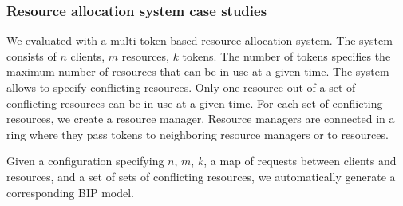 \begin{table}
\label{bench:dining}
\end{table}



\subsubsection{Resource allocation system case studies}

We evaluated \deadlocktool{} with a multi token-based resource allocation system. 
The system consists of $n$ clients, $m$ resources, $k$ tokens. 
The number of tokens specifies the maximum number of resources that
can be in use at a given time. 
The system allows to specify conflicting resources. 
Only one resource out of a set of conflicting resources can be in use at a given time.
For each set of conflicting resources, we create a resource manager.
Resource managers are connected in a ring where they pass tokens to neighboring resource managers or to resources. 

Given a configuration specifying $n$, $m$, $k$, a map of requests between clients and resources, and a set of sets of conflicting resources, 
we automatically generate a corresponding BIP model.

